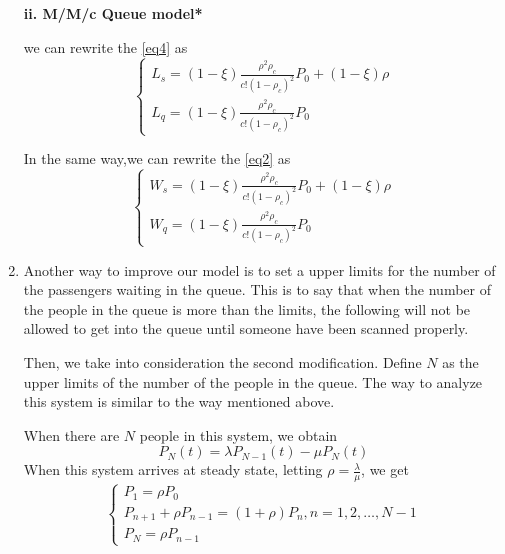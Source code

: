 \documentclass{mcmthesis}
\begin{document}
\begin{enumerate}
  \par  {\bf ii. M/M/c Queue model*}
\par we can rewrite the \ref{eq4} as
    \begin{equation}    
\left  \{
       \begin{array}{lr}
           L_s=(1-\xi)\frac{\rho ^2\rho_c}{c!(1-\rho_c)^2}P_0 +(1-\xi)\rho \\ \label{eq4.35}
          L_q=(1-\xi)\frac{\rho ^2\rho_c}{c!(1-\rho_c)^2}P_0 
        \end{array}
\right.
\end{equation}

 In the same way,we can rewrite the \ref{eq2} as
\begin{equation}    
\left  \{
       \begin{array}{lr}
           W_s=(1-\xi)\frac{\rho ^2\rho_c}{c!(1-\rho_c)^2}P_0 +(1-\xi)\rho \\ \label{eq4.36}
          W_q=(1-\xi)\frac{\rho ^2\rho_c}{c!(1-\rho_c)^2}P_0 
        \end{array}
\right.
\end{equation}

		\item Another way to improve our model is to set a upper limits for the number of the passengers waiting in the queue. This is to say that when the number of the people in the queue is more than the limits, the following will not be allowed to get into the queue until someone have been scanned properly.
       \par Then, we take into consideration the second modification. Define ${N}$ as the upper limits of the number of the people in the queue. The way to analyze this system is similar to the way mentioned above.
	
	When there are ${N}$ people in this system, we obtain
		\begin{equation}
			P_N(t) = \lambda P_{N-1}(t) - \mu P_N(t)
		\end{equation}
	When this system arrives at steady state, letting ${\rho = \frac {\lambda}{\mu}}$, we get
\begin{equation}    
\left  \{
       \begin{array}{lr}
           P_1 = \rho P_0\\
            P_{n+1} + \rho P_{n-1} = (1 +\rho )P_n, n=1,2,\dots,N-1\\
            P_N = \rho P_{n-1}
        \end{array}
\right.
\end{equation}


\end{enumerate}
\end{document}
